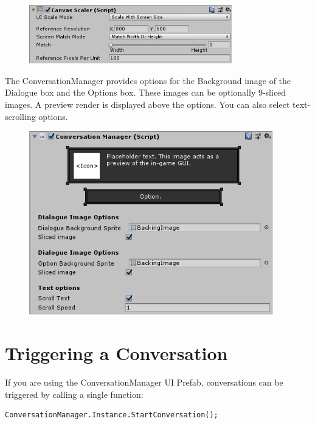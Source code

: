 \documentclass[a4paper,12pt]{article}
\begin{document}
\begin{figure}[h]
\centering
\includegraphics[width=250pt, keepaspectratio]{img/CanvasScalarComponent.png}
\end{figure}

The ConversationManager provides options for the Background image of the Dialogue box and the Options box. These images can be optionally 9-sliced images. A preview render is displayed above the options. You can also select text-scrolling options.

\begin{figure}[h]
\centering
\includegraphics[width=300pt, keepaspectratio]{img/ConversationManager.png}
\end{figure}

\newpage





\section{Triggering a Conversation}
\hypertarget{_triggering}{}

If you are using the ConversationManager UI Prefab, conversations can be triggered by calling a single function:
\bigskip

\begin{lstlisting}
ConversationManager.Instance.StartConversation();
\end{lstlisting}
\bigskip
\end{document}
